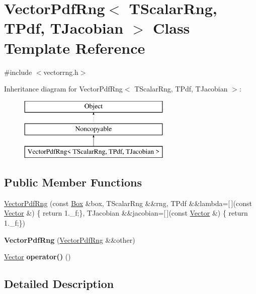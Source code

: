 \hypertarget{classVectorPdfRng}{}\section{Vector\+Pdf\+Rng$<$ T\+Scalar\+Rng, T\+Pdf, T\+Jacobian $>$ Class Template Reference}
\label{classVectorPdfRng}


{\ttfamily \#include $<$vectorrng.\+h$>$}

Inheritance diagram for Vector\+Pdf\+Rng$<$ T\+Scalar\+Rng, T\+Pdf, T\+Jacobian $>$\+:\begin{figure}[H]
\begin{center}
\leavevmode
\includegraphics[height=3.000000cm]{classVectorPdfRng}
\end{center}
\end{figure}
\subsection*{Public Member Functions}
\begin{DoxyCompactItemize}
\item 
\hyperlink{classVectorPdfRng_a4251ad37fad4cdbbbcfba87ba4997d12}{Vector\+Pdf\+Rng} (const \hyperlink{classBox}{Box} \&box, T\+Scalar\+Rng \&\&rng, T\+Pdf \&\&lambda=\mbox{[}$\,$\mbox{]}(const \hyperlink{classBasicVector}{Vector} \&) \{ return 1.\+\_\+f;\}, T\+Jacobian \&\&jacobian=\mbox{[}$\,$\mbox{]}(const \hyperlink{classBasicVector}{Vector} \&) \{ return 1.\+\_\+f;\})
\item 
\hypertarget{classVectorPdfRng_aaaa9b4f2636192ef9bb0245d69a180b0}{}\label{classVectorPdfRng_aaaa9b4f2636192ef9bb0245d69a180b0} 
{\bfseries Vector\+Pdf\+Rng} (\hyperlink{classVectorPdfRng}{Vector\+Pdf\+Rng} \&\&other)
\item 
\hypertarget{classVectorPdfRng_abdc6ab74df6db2b802467d107a077e99}{}\label{classVectorPdfRng_abdc6ab74df6db2b802467d107a077e99} 
\hyperlink{classBasicVector}{Vector} {\bfseries operator()} ()
\end{DoxyCompactItemize}


\subsection{Detailed Description}
